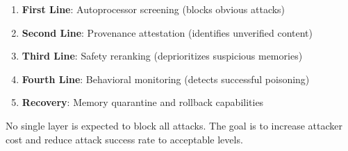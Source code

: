 \begin{enumerate}
    \item \textbf{First Line}: Autoprocessor screening (blocks obvious attacks)
    \item \textbf{Second Line}: Provenance attestation (identifies unverified content)
    \item \textbf{Third Line}: Safety reranking (deprioritizes suspicious memories)
    \item \textbf{Fourth Line}: Behavioral monitoring (detects successful poisoning)
    \item \textbf{Recovery}: Memory quarantine and rollback capabilities
\end{enumerate}

No single layer is expected to block all attacks. The goal is to increase attacker cost and reduce attack success rate to acceptable levels.
